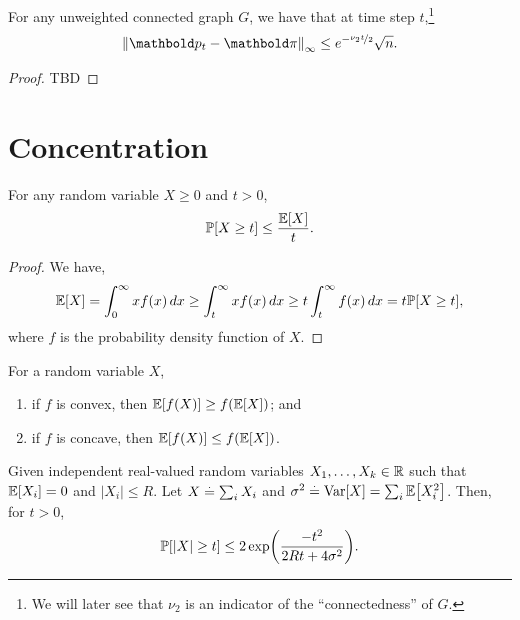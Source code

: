 \begin{thm}
For any unweighted connected graph $G$, we have that at time step $t$,\footnote{We will later see that $\nu_2$ is an indicator of the ``connectedness'' of $G$.} \begin{align}
    \norm{\vp_t - \vpi}_\infty \leq e^{-\nicefrac{\nu_2 t}{2}}\sqrt{n}.
\end{align}
\end{thm}
\begin{proof}
TBD
\end{proof}

\section{Concentration}

\begin{thm}
For any random variable $X \geq 0$ and $t > 0$, \begin{align}
    \Pr{X \geq t} \leq \frac{\E{X}}{t}.
\end{align}
\end{thm}
\begin{proof} We have, \begin{align*}
    \E{X} = \int_0^\infty x f(x) \,dx \geq \int_t^\infty x f(x) \, dx \geq t \int_t^\infty f(x) \,dx = t \Pr{X \geq t},
\end{align*} where $f$ is the probability density function of $X$.
\end{proof}

\begin{thm}
For a random variable $X$, \begin{enumerate}
    \item if $f$ is convex, then $\E{f(X)} \geq f(\E{X})$; and
    \item if $f$ is concave, then $\E{f(X)} \leq f(\E{X})$.
\end{enumerate}
\end{thm}

\begin{thm} Given independent real-valued random variables $X_1, \dots, X_k \in \mathbb{R}$ such that $\E{X_i} = 0$ and $|X_i| \leq R$. Let $X \overset{.}{=} \sum_i X_i$ and $\sigma^2 \defeq \Var{X} = \sum_i \E{X_i^2}$. Then, for $t > 0$, \begin{align}
    \Pr{|X| \geq t} \leq 2 \exp\parentheses*{\frac{-t^2}{2Rt + 4\sigma^2}}.
\end{align}
\end{thm}

